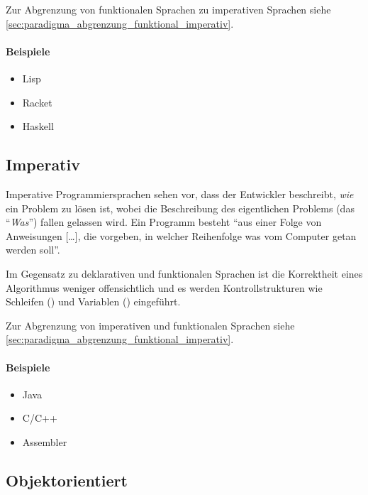    Zur Abgrenzung von funktionalen Sprachen zu imperativen Sprachen siehe \ref{sec:paradigma_abgrenzung_funktional_imperativ}.
    
    \paragraph{Beispiele}
        \begin{itemize}
            \item Lisp
            \item Racket
            \item Haskell
        \end{itemize}

\subsection{Imperativ}
    \label{sec:paradigma_imperativ}

    Imperative Programmiersprachen sehen vor, dass der Entwickler beschreibt, \textit{wie} ein Problem zu lösen ist, wobei die Beschreibung des eigentlichen Problems (das \enquote{\textit{Was}}) fallen gelassen wird. Ein Programm besteht \enquote{aus einer Folge von Anweisungen [\dots], die vorgeben, in welcher Reihenfolge was vom Computer getan werden soll}. ~\cite{andreas2005grundkurs}
    
    Im Gegensatz zu deklarativen und funktionalen Sprachen ist die Korrektheit eines Algorithmus weniger offensichtlich und es werden Kontrollstrukturen wie Schleifen () und Variablen () eingeführt.
    
    Zur Abgrenzung von imperativen und funktionalen Sprachen siehe \ref{sec:paradigma_abgrenzung_funktional_imperativ}.
    
    \paragraph{Beispiele}
        \begin{itemize}
            \item Java
            \item C/C++
            \item Assembler
        \end{itemize}

\subsection{Objektorientiert}
    
